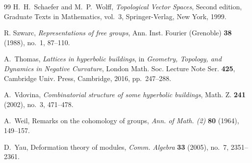 \documentclass[12pt]{amsproc}
\theoremstyle{plain}
\theoremstyle{definition}
\numberwithin{equation}{section}
\begin{document}
\begin{thebibliography}{99}
H.~H.~Schaefer and M.~P.~Wolff,
\emph{Topological Vector Spaces},
Second edition, Graduate Texts in Mathematics, vol.~3,
Springer-Verlag, New York, 1999.

R. Szwarc,
\emph{Representations of free groups},
Ann. Inst. Fourier (Grenoble) \textbf{38} (1988), no.~1, 87--110.

A.~Thomas,
\textit{Lattices in hyperbolic buildings},
in \textit{Geometry, Topology, and Dynamics in Negative Curvature},
London Math. Soc. Lecture Note Ser. \textbf{425},
Cambridge Univ. Press, Cambridge, 2016, pp.~247--288.

A.~Vdovina,
\textit{Combinatorial structure of some hyperbolic buildings},
Math. Z. \textbf{241} (2002), no.~3, 471--478.

A.~Weil,
Remarks on the cohomology of groups,
\emph{Ann. of Math. (2)} \textbf{80} (1964), 149--157.

D.~Yau,
Deformation theory of modules,
\emph{Comm. Algebra} \textbf{33} (2005), no.~7, 2351--2361.

\end{thebibliography}
\end{document}
